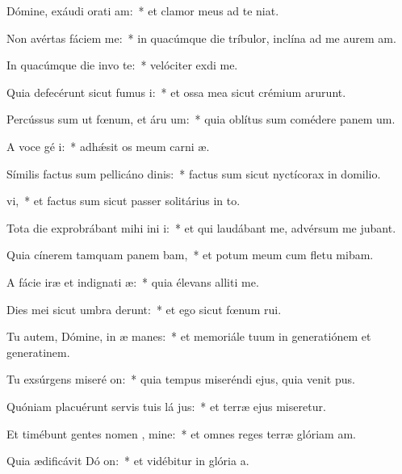 \item Dómine, exáudi orati am:~* et clamor meus ad te niat.
\item Non avértas fáciem   me:~* in quacúmque die tríbulor, inclína ad me aurem am.
\item In quacúmque die invo te:~* velóciter exdi me.
\item Quia defecérunt sicut fumus  i:~* et ossa mea sicut crémium arurunt.
\item Percússus sum ut fœnum, et áru  um:~* quia oblítus sum comédere panem um.
\item A voce gé i:~* adhǽsit os meum carni æ.
\item Símilis factus sum pellicáno dinis:~* factus sum sicut nyctícorax in domilio.
\item {}vi,~* et factus sum sicut passer solitárius in to.
\item Tota die exprobrábant mihi ini i:~* et qui laudábant me, advérsum me jubant.
\item Quia cínerem tamquam panem bam,~* et potum meum cum fletu mibam.
\item A fácie iræ et indignati æ:~* quia élevans alliti me.
\item Dies mei sicut umbra derunt:~* et ego sicut fœnum rui.
\item Tu autem, Dómine, in æ manes:~* et memoriále tuum in generatiónem et generatinem.
\item Tu exsúrgens miseré on:~* quia tempus miseréndi ejus, quia venit pus.
\item Quóniam placuérunt servis tuis lá jus:~* et terræ ejus miseretur.
\item Et timébunt gentes nomen , mine:~* et omnes reges terræ glóriam am.
\item Quia ædificávit Dó on:~* et vidébitur in glória a.
